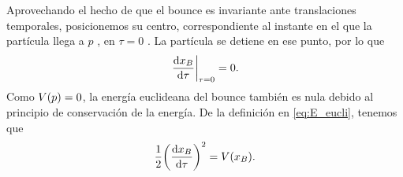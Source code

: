 Aprovechando el hecho de que el bounce es invariante ante translaciones temporales, posicionemos su centro, correspondiente al instante en el que la partícula llega a $p$ , en $\tau = 0$ \cite{coleman1977fate}. La partícula se detiene en ese punto, por lo que
\begin{equation} \label{eq:vel}
\eval{\dv{x_B}{\tau}}_{\tau = 0} = 0.
\end{equation}
Como $V\qty(p) = 0$, la energía euclideana del bounce también es nula debido al principio de conservación de la energía. De la definición en \eqref{eq:E_eucli}, tenemos que
\begin{equation} \label{eq:K=V}
\frac{1}{2}\qty(\dv{x_B}{\tau})^2 = V\qty(x_B).
\end{equation}

